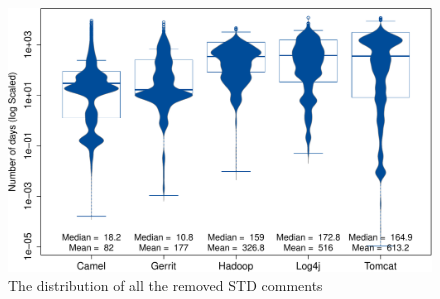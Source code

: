 \begin{figure}[t]
	\centering
	\includegraphics[width=0.9\columnwidth]{figures/test/removed_all_STD_comments.pdf}
	\caption{The distribution of all the removed STD comments}
	\label{fig:removed_all_std_comments}
\end{figure}






